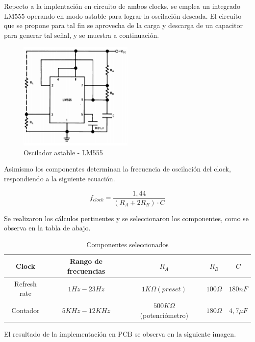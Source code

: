 Repecto a la implentaci\'on en circuito de ambos clocks, se emplea un integrado LM555 operando en modo astable para lograr la oscilaci\'on deseada. El circuito que se propone para tal fin se aprovecha de la carga y descarga de un capacitor para generar tal se\~nal, y se muestra a continuaci\'on.

\begin{figure}[H]
    \centering
    \includegraphics[width=0.5\textwidth]{../EJ8/Recursos/555_astable}
    \caption{\label{fig:ASTABLE_555}Oscilador astable - LM555}
\end{figure}

Asimismo los componentes determinan la frecuencia de oscilaci\'on del clock, respondiendo a la siguiente ecuaci\'on.

\begin{equation}
f_{clock} = \frac{1,44}{(R_A+2R_B)\cdot C}    
\end{equation}

Se realizaron los c\'alculos pertinentes y se seleccionaron los componentes, como se observa en la tabla de abajo.


  \begin{table}[H]
	\begin{center}
		\begin{tabular}{c c c c c}
		 Clock & Rango de frecuencias & $R_A$ & $R_B$ & $C$ \\
		\hline
		Refresh rate &$1Hz - 23Hz$ &$1 K\Omega (preset)$ & $100 \Omega$ & $180 nF$ \\
		Contador & $5KHz - 12KHz$ & $500 K\Omega$ (potenci\'ometro) & $180 \Omega$ & $4,7 \mu F$  
		\end{tabular}
		
		\caption{Componentes seleccionados}
	\end{center}
\end{table}

El resultado de la implementaci\'on en PCB se observa en la siguiente imagen.

